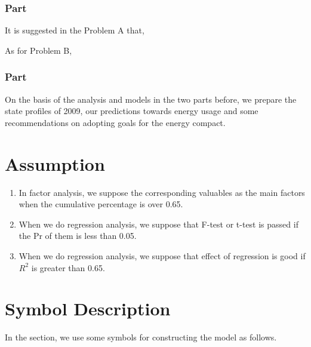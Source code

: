 \documentclass[a4paper,11pt]{article}
\begin{document}
\subsubsection{Part \uppercase\expandafter{}}
\par It is suggested in the Problem A that,

\par As for Problem B, 

\subsubsection{Part \uppercase\expandafter{}}
\par On the basis of the analysis and models in the two parts before, we prepare the state profiles of 2009, our predictions towards energy usage and some recommendations on adopting goals for the energy compact.


\section{Assumption}
\begin{enumerate}%
\renewcommand{\labelenumi}{(\theenumi)}
    \item In factor analysis, we suppose the corresponding valuables as the main factors when the cumulative percentage is over 0.65.
    \item When we do regression analysis, we suppose that F-test or t-test is passed if the Pr of them is less than 0.05.
    \item When we do regression analysis, we suppose that effect of regression is good if $R^{2}$ is greater than 0.65.
\end{enumerate}



\section{Symbol Description}
In the section, we use some symbols for constructing the model as follows.
\end{document}
